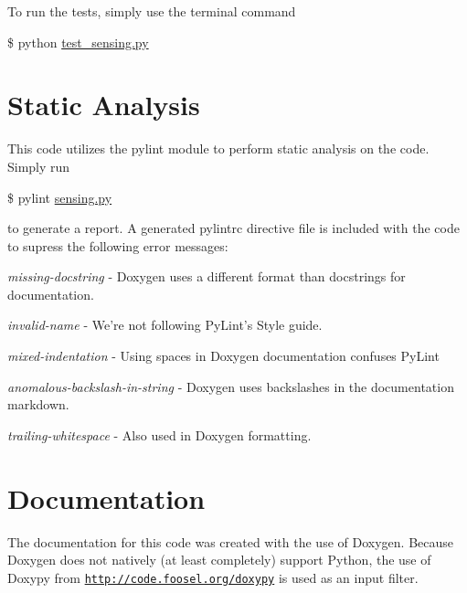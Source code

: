 To run the tests, simply use the terminal command

\$ python \hyperlink{test__sensing_8py}{test\-\_\-sensing.\-py}\hypertarget{index_static}{}\section{Static Analysis}\label{index_static}
This code utilizes the pylint module to perform static analysis on the code. Simply run

\$ pylint \hyperlink{sensing_8py}{sensing.\-py}

to generate a report. A generated pylintrc directive file is included with the code to supress the following error messages\-:

{\itshape missing-\/docstring} -\/ Doxygen uses a different format than docstrings for documentation.

{\itshape invalid-\/name} -\/ We're not following Py\-Lint's Style guide.

{\itshape mixed-\/indentation} -\/ Using spaces in Doxygen documentation confuses Py\-Lint

{\itshape anomalous-\/backslash-\/in-\/string} -\/ Doxygen uses backslashes in the documentation markdown.

{\itshape trailing-\/whitespace} -\/ Also used in Doxygen formatting.\hypertarget{index_documents}{}\section{Documentation}\label{index_documents}
The documentation for this code was created with the use of Doxygen. Because Doxygen does not natively (at least completely) support Python, the use of Doxypy from \href{http://code.foosel.org/doxypy}{\tt http\-://code.\-foosel.\-org/doxypy} is used as an input filter. 